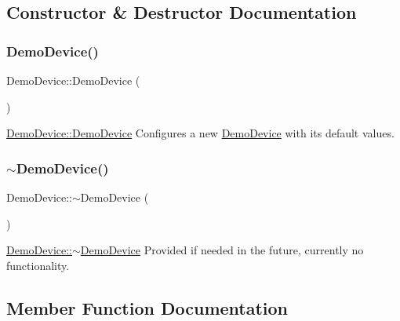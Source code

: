 \subsection{Constructor \& Destructor Documentation}
\hypertarget{class_demo_device_a9fc771c4152f0d9de78a69187cbd7a58}{}\label{class_demo_device_a9fc771c4152f0d9de78a69187cbd7a58} 
\subsubsection{\texorpdfstring{Demo\+Device()}{DemoDevice()}}
{\footnotesize\ttfamily Demo\+Device\+::\+Demo\+Device (\begin{DoxyParamCaption}{ }\end{DoxyParamCaption})}



\hyperlink{class_demo_device_a9fc771c4152f0d9de78a69187cbd7a58}{Demo\+Device\+::\+Demo\+Device} Configures a new \hyperlink{class_demo_device}{Demo\+Device} with its default values. 

\hypertarget{class_demo_device_aff994361f45ae993feb854f72a2a32a6}{}\label{class_demo_device_aff994361f45ae993feb854f72a2a32a6} 
\subsubsection{\texorpdfstring{$\sim$\+Demo\+Device()}{~DemoDevice()}}
{\footnotesize\ttfamily Demo\+Device\+::$\sim$\+Demo\+Device (\begin{DoxyParamCaption}{ }\end{DoxyParamCaption})}



\hyperlink{class_demo_device_aff994361f45ae993feb854f72a2a32a6}{Demo\+Device\+::$\sim$\+Demo\+Device} Provided if needed in the future, currently no functionality. 



\subsection{Member Function Documentation}
\hypertarget{class_demo_device_a52de363ec31fdbb540cf7cae6f584d22}{}\label{class_demo_device_a52de363ec31fdbb540cf7cae6f584d22} 
